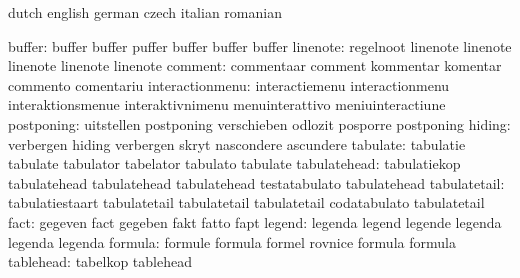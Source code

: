 
\startvariables            dutch                     english
                           german                    czech
                           italian                   romanian

                   buffer: buffer                    buffer
                           puffer                    buffer
                           buffer                    buffer
                 linenote: regelnoot                 linenote
                           linenote                  linenote
                           linenote                  linenote
                  comment: commentaar                comment
                           kommentar                 komentar
                           commento                  comentariu
          interactionmenu: interactiemenu            interactionmenu
                           interaktionsmenue         interaktivnimenu
                           menuinterattivo           meniuinteractiune
               postponing: uitstellen                postponing
                           verschieben               odlozit
                           posporre                  postponing %
                   hiding: verbergen                 hiding
                           verbergen                 skryt
                           nascondere                ascundere
                 tabulate: tabulatie                 tabulate
                           tabulator                 tabelator
                           tabulato                  tabulate
             tabulatehead: tabulatiekop              tabulatehead
                           tabulatehead              tabulatehead
                           testatabulato             tabulatehead %
             tabulatetail: tabulatiestaart           tabulatetail
                           tabulatetail              tabulatetail
                           codatabulato              tabulatetail %
                     fact: gegeven                   fact
                           gegeben                   fakt
                           fatto                     fapt
                   legend: legenda                   legend
                           legende                   legenda
                           legenda                   legenda
                  formula: formule                   formula
                           formel                    rovnice
                           formula                   formula
                tablehead: tabelkop                  tablehead
